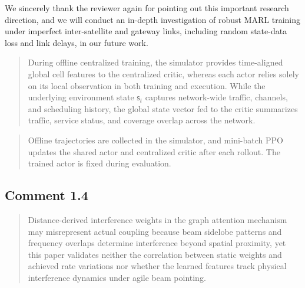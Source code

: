 \documentclass[11pt,a4paper]{article}
\begin{document}
We sincerely thank the reviewer again for pointing out this important research direction, and we will conduct an in-depth investigation of robust MARL training under imperfect inter-satellite and gateway links, including random state-data loss and link delays, in our future work.
\par


\begin{quote}\small\color{revisionblue}
During offline centralized training, the simulator provides time-aligned global cell features to the centralized critic, whereas each actor relies solely on its local observation in both training and execution. While the underlying environment state $\mathsf{s}_t$ captures network-wide traffic, channels, and scheduling history, the global state vector fed to the critic summarizes traffic, service status, and coverage overlap across the network.
\par
\end{quote}


\begin{quote}\small\color{revisionblue}
Offline trajectories are collected in the simulator, and mini-batch PPO updates the shared actor and centralized critic after each rollout. The trained actor is fixed during evaluation.
\par
\end{quote}


\subsection*{Comment 1.4}

\begin{quote}\small Distance-derived interference weights in the graph attention mechanism may misrepresent actual coupling because beam sidelobe patterns and frequency overlaps determine interference beyond spatial proximity, yet this paper validates neither the correlation between static weights and achieved rate variations nor whether the learned features track physical interference dynamics under agile beam pointing.\end{quote}
\end{document}
